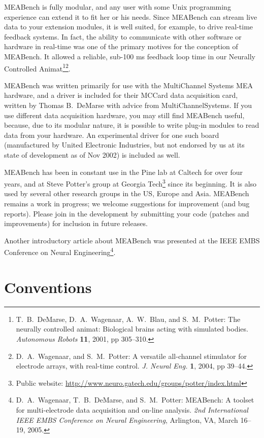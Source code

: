 \documentclass[12pt,oneside]{book}
\def\Meabench{{MEABench}\xspace}
\def\meabench{{MEABench}\xspace}
\begin{document}
\Meabench is fully modular, and any user with some Unix programming
experience can extend it to fit her or his needs. Since \meabench can
stream live data to your extension modules, it is well suited, for
example, to drive real-time feedback systems. In fact, the ability to
communicate with other software or hardware in real-time was one of
the primary motives for the conception of \meabench. It allowed a
reliable, sub-100 ms feedback loop time in our Neurally Controlled
Animat\footnote{T.\ B.\ DeMarse, D.\ A.\ Wagenaar, A.\ W.\ Blau, and
S.\ M.\ Potter: The neurally controlled animat: Biological
brains acting with simulated bodies. \emph{Autonomous Robots} {\bf 11},
2001, pp 305--310.}\footnote{D.\ A.\ Wagenaar, and S.\ M.\ Potter: A
versatile all-channel stimulator for electrode arrays, with real-time
control. \emph{J. Neural Eng.} {\bf 1}, 2004, pp 39--44.}.

\Meabench was written primarily for use with the MultiChannel Systems
MEA hardware, and a driver is included for their MCCard data
acquisition card, written by Thomas B.\ DeMarse with advice from
MultiChannelSystems. If you use different data acquisition hardware,
you may still find \meabench useful, because, due to its modular
nature, it is possible to write plug-in modules to read data from your
hardware. An experimental driver for one such board (manufactured by
United Electronic Industries, but not endorsed by us at its
state of development as of Nov 2002) is included as well.

\Meabench has been in constant use in the Pine lab at
Caltech for over four years, and at Steve Potter's group at Georgia
Tech\footnote{Public website: \url{http://www.neuro.gatech.edu/groups/potter/index.html}} since its
beginning. It is also used by several other research groups in the US,
Europe and Asia.
\Meabench remains a work in progress; we welcome
suggestions for improvement (and bug reports). Please join in the
development by submitting your code (patches and improvements) for
inclusion in future releases.

Another introductory article about \meabench was presented at the IEEE
EMBS Conference on Neural Engineering\footnote{D.~A.~Wagenaar,
T.~B.~DeMarse, and S.~M.~Potter: MEABench: A toolset for
multi-electrode data acquisition and on-line analysis. \emph{2nd
International IEEE EMBS Conference on Neural Engineering}, Arlington,
VA, March 16--19, 2005.}.



\section{Conventions}
\end{document}
